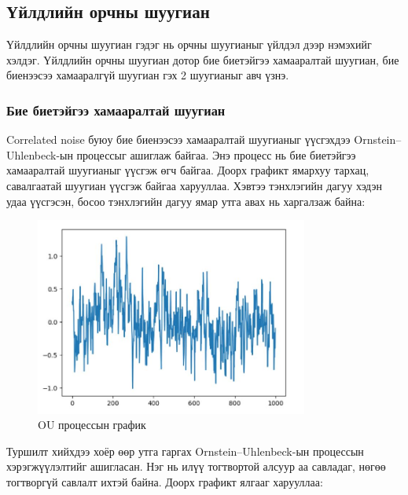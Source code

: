 \documentclass[12pt,A4]{report}
\begin{document}
\subsection{Үйлдлийн орчны шуугиан}

Үйлдлийн орчны шуугиан гэдэг нь орчны шуугианыг үйлдэл дээр нэмэхийг хэлдэг. Үйлдлийн орчны шуугиан дотор бие биетэйгээ хамааралтай шуугиан, бие биенээсээ хамааралгүй шуугиан гэх 2 шуугианыг авч үзнэ.

\subsubsection{Бие биетэйгээ хамааралтай шуугиан}

Correlated noise буюу бие биенээсээ хамааралтай шуугианыг үүсгэхдээ Ornstein–Uhlenbeck-ын процессыг ашиглаж байгаа. Энэ процесс нь бие биетэйгээ хамааралтай шуугианыг үүсгэж өгч байгаа. Доорх графикт ямархуу тархац, савалгаатай шуугиан үүсгэж байгаа харууллаа. Хэвтээ тэнхлэгийн дагуу хэдэн удаа үүсгэсэн, босоо тэнхлэгийн дагуу ямар утга авах нь харгалзаж байна:

\begin{figure}[H]
\centering
\includegraphics[width=0.8\textwidth]{./images/OU_process_graph}
\caption{OU процессын график}
\end{figure}

Туршилт хийхдээ хоёр өөр утга гаргах Ornstein–Uhlenbeck-ын процессын хэрэгжүүлэлтийг ашигласан. Нэг нь илүү тогтвортой алсуур аа савладаг, нөгөө тогтворгүй савлалт ихтэй байна. Доорх графикт ялгааг харууллаа:
\end{document}
